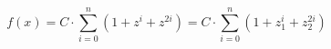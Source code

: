 \[
    f(x) = C \cdot \sum^n_{i=0} \left ( 1 + z^i + z^{2i} \right ) = C \cdot \sum^n_{i=0} \left ( 1 + z^i_1 + z^{2i}_2 \right )
\]
